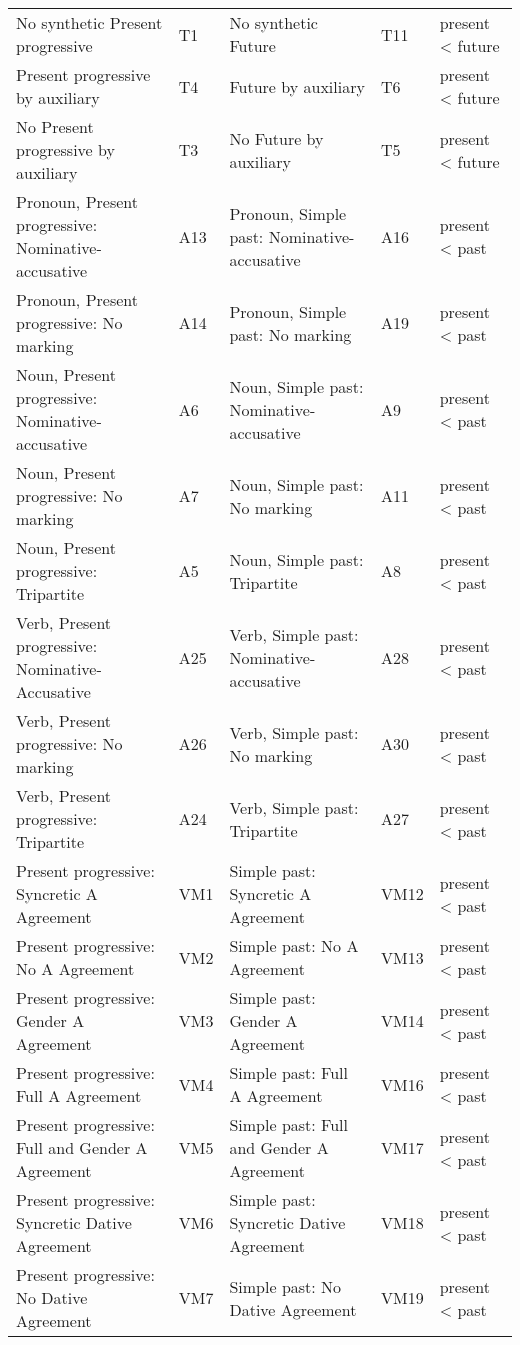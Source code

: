 \begin{longtable}{p{.3\linewidth}p{.05\linewidth}p{.3\linewidth}p{.05\linewidth}p{.2\linewidth}}
No synthetic Present progressive & T1 & No synthetic Future & T11 & present < future\\
Present progressive by auxiliary & T4 & Future by auxiliary & T6 & present < future\\
No Present progressive by auxiliary & T3 & No Future by auxiliary & T5 & present < future\\
Pronoun, Present progressive: Nominative-accusative & A13 & Pronoun, Simple past: Nominative-accusative & A16 & present < past\\
Pronoun, Present progressive: No marking & A14 & Pronoun, Simple past: No marking & A19 & present < past\\
Noun, Present progressive: Nominative-accusative & A6 & Noun, Simple past: Nominative-accusative & A9 & present < past\\
Noun, Present progressive: No marking & A7 & Noun, Simple past: No marking & A11 & present < past\\
Noun, Present progressive: Tripartite & A5 & Noun, Simple past: Tripartite & A8 & present < past\\
Verb, Present progressive: Nominative-Accusative & A25 & Verb, Simple past: Nominative-accusative & A28 & present < past\\
Verb, Present progressive: No marking & A26 & Verb, Simple past: No marking & A30 & present < past\\
Verb, Present progressive: Tripartite & A24 & Verb, Simple past: Tripartite & A27 & present < past\\
Present progressive: Syncretic A Agreement & VM1 & Simple past: Syncretic A Agreement & VM12 & present < past\\
Present progressive: No A Agreement & VM2 & Simple past: No A Agreement & VM13 & present < past\\
Present progressive: Gender A Agreement & VM3 & Simple past: Gender A Agreement & VM14 & present < past\\
Present progressive: Full A Agreement & VM4 & Simple past: Full A Agreement & VM16 & present < past\\
Present progressive: Full and Gender A Agreement & VM5 & Simple past: Full and Gender A Agreement & VM17 & present < past\\
Present progressive: Syncretic Dative Agreement & VM6 & Simple past: Syncretic Dative Agreement & VM18 & present < past\\
Present progressive: No Dative Agreement & VM7 & Simple past: No Dative Agreement & VM19 & present < past\\

\end{longtable}
